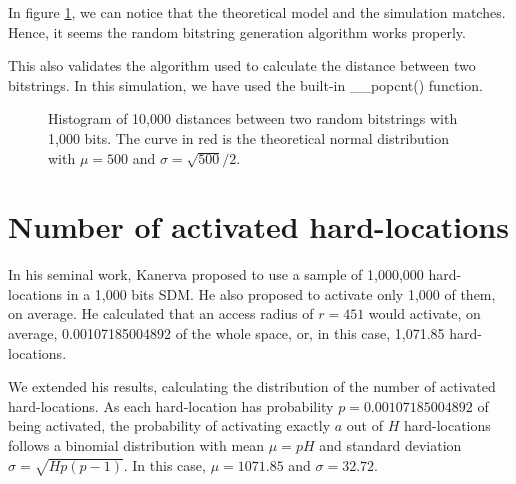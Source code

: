 In figure \ref{fig:validation-distance}, we can notice that the theoretical model and the simulation matches. Hence, it seems the random bitstring generation algorithm works properly.

This also validates the algorithm used to calculate the distance between two bitstrings. In this simulation, we have used the built-in \_\_popcnt() function.

\begin{figure}[!htb]
  \centering

  \caption{Histogram of 10,000 distances between two random bitstrings with 1,000 bits. The curve in red is the theoretical normal distribution with $\mu = 500$ and $\sigma = \sqrt{500}/2$.}
  \label{fig:validation-distance}
\end{figure}


\section{Number of activated hard-locations}

In his seminal work, Kanerva proposed to use a sample of 1,000,000 hard-locations in a 1,000 bits SDM. He also proposed to activate only 1,000 of them, on average. He calculated that an access radius of $r=451$ would activate, on average, 0.00107185004892 of the whole space, or, in this case, 1,071.85 hard-locations.

We extended his results, calculating the distribution of the number of activated hard-locations. As each hard-location has probability $p=0.00107185004892$ of being activated, the probability of activating exactly $a$ out of $H$ hard-locations follows a binomial distribution with mean $\mu = pH$ and standard deviation $\sigma = \sqrt{Hp(p-1)}$. In this case, $\mu = 1071.85$ and $\sigma = 32.72$.

